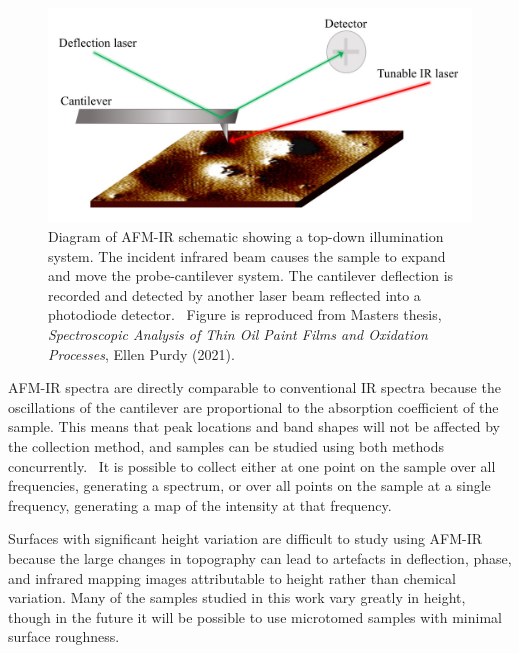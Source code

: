\begin{figure}[H]
\centering
  \includegraphics[width=\linewidth]{afm_diagram}
\caption[Diagram of AFM-IR schematic showing a top-down illumination system.]{Diagram of AFM-IR schematic showing a top-down illumination system. The incident infrared beam causes the sample to expand and move the probe-cantilever system. The cantilever deflection is recorded and detected by another laser beam reflected into a photodiode detector.~\autocite{Morsch,dazzi2017} Figure is reproduced from Masters thesis, \textit{Spectroscopic Analysis of Thin Oil Paint Films and Oxidation Processes}, Ellen Purdy (2021).}
\label{fig:afm_diagram}
\end{figure}

AFM-IR spectra are directly comparable to conventional IR spectra because the oscillations of the cantilever are proportional to the absorption coefficient of the sample. This means that peak locations and band shapes will not be affected by the collection method, and samples can be studied using both methods concurrently.~\autocite{dazzi2017,kurouski} It is possible to collect either at one point on the sample over all frequencies, generating a spectrum, or over all points on the sample at a single frequency, generating a map of the intensity at that frequency.

Surfaces with significant height variation are difficult to study using AFM-IR because the large changes in topography can lead to artefacts in deflection, phase, and infrared mapping images attributable to height rather than chemical variation. Many of the samples studied in this work vary greatly in height, though in the future it will be possible to use microtomed samples with minimal surface roughness. 



